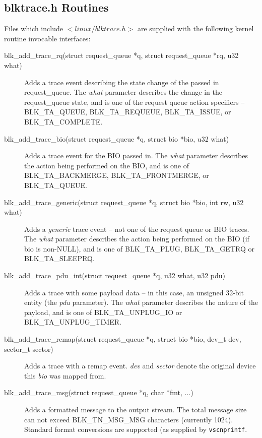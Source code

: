 \documentclass{article}
\begin{document}
\subsection{blktrace.h Routines}
Files which include $<linux/blktrace.h>$ are supplied with the following
kernel routine invocable interfaces:

\begin{description}
  \item[blk\_add\_trace\_rq(struct request\_queue *q, struct request\_queue 
  								*rq, u32 what)]
	Adds a trace event describing the state change of the passed in
	request\_queue. The \emph{what} parameter describes the change in
	the request\_queue state, and is one of the request queue action 
	specifiers -- BLK\_TA\_QUEUE, BLK\_TA\_REQUEUE, BLK\_TA\_ISSUE,
	or BLK\_TA\_COMPLETE.

  \item[blk\_add\_trace\_bio(struct request\_queue *q, struct bio *bio, 
  								u32 what)]
	Adds a trace event for the BIO passed in. The \emph{what} parameter
	describes the action being performed on the BIO, and is one of
	BLK\_TA\_BACKMERGE, BLK\_TA\_FRONTMERGE, or BLK\_TA\_QUEUE.

  \item[blk\_add\_trace\_generic(struct request\_queue *q, struct bio *bio, 
							int rw, u32 what)]
	Adds a \emph{generic} trace event -- not one of the request queue
	or BIO traces. The \emph{what} parameter describes the action being 
	performed on the BIO (if bio is non-NULL), and is one of
	BLK\_TA\_PLUG, BLK\_TA\_GETRQ or BLK\_TA\_SLEEPRQ.

  \item[blk\_add\_trace\_pdu\_int(struct request\_queue *q, u32 what,
  								u32 pdu)]
	Adds a trace with some payload data -- in this case, an unsigned
	32-bit entity (the \emph{pdu} parameter). The \emph{what} parameter
	describes the nature of the payload, and is one of
	BLK\_TA\_UNPLUG\_IO or BLK\_TA\_UNPLUG\_TIMER.

  \item[blk\_add\_trace\_remap(struct request\_queue *q, struct bio  *bio,
						dev\_t dev, sector\_t sector)]
	Adds a trace with a remap event. \emph{dev} and \emph{sector} denote
	the original device this \emph{bio} was mapped from.

  \item[blk\_add\_trace\_msg(struct request\_queue *q, char *fmt, ...)]
	Adds a formatted message to the output stream. The total message
	size can not exceed BLK\_TN\_MSG\_MSG characters (currently
	1024). Standard format conversions are supported (as supplied
	by \texttt{vscnprintf}.

\end{description}
\end{document}
